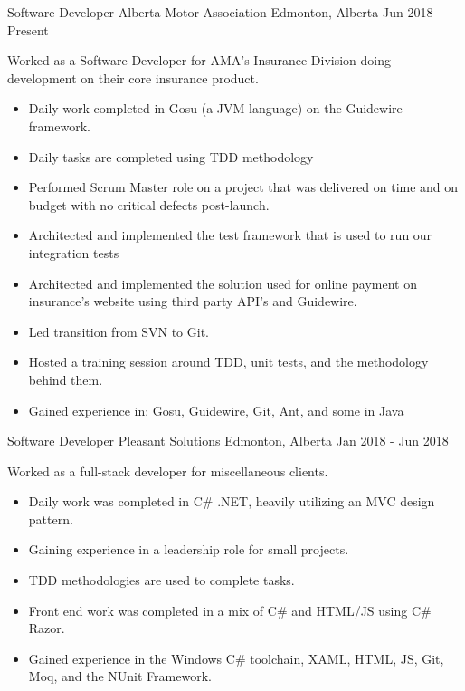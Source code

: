 
\begin{cventries}
    \cventry
        {Software Developer}
        {Alberta Motor Association}
        {Edmonton, Alberta}
        {Jun 2018 - Present}
        {
            Worked as a Software Developer for AMA's Insurance Division doing development on their core insurance product.
            \begin{itemize}
                \item Daily work completed in Gosu (a JVM language) on the Guidewire framework.
                \item Daily tasks are completed using TDD methodology
                \item Performed Scrum Master role on a project that was delivered on time and on budget with no critical defects post-launch.
                \item Architected and implemented the test framework that is used to run our integration tests
                \item Architected and implemented the solution used for online payment on insurance's website using third party API's and Guidewire.
                \item Led transition from SVN to Git.
                \item Hosted a training session around TDD, unit tests, and the methodology behind them.
                \item Gained experience in: Gosu, Guidewire, Git, Ant, and some in Java
            \end{itemize}
        }
    \cventry
        {Software Developer}
        {Pleasant Solutions}
        {Edmonton, Alberta}
        {Jan 2018 - Jun 2018}
        {
            Worked as a full-stack developer for miscellaneous clients.
            \begin{itemize}
                \item Daily work was completed in C\# .NET, heavily utilizing an MVC design pattern.
                \item Gaining experience in a leadership role for small projects.
                \item TDD methodologies are used to complete tasks.
                \item Front end work was completed in a mix of C\# and HTML/JS using C\# Razor.
                \item Gained experience in the Windows C\# toolchain, XAML, HTML, JS, Git, Moq, and the NUnit Framework.

\end{itemize}}
\end{cventries}

